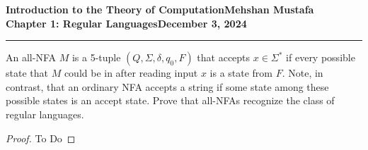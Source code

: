 \documentclass[11pt]{article}
\newcommand{\myname}{Mehshan Mustafa}
\newcommand{\dated}{December 3, 2024} %
\newenvironment{problem}[2][Problem]{\begin{trivlist}
\item[\hskip \labelsep {\bfseries #1}\hskip \labelsep {\bfseries #2.}]}{\end{trivlist}}
\begin{document}
\textbf{Introduction to the Theory of
Computation}\hfill\textbf{\myname}\\[0.01in]
\textbf{Chapter 1: Regular Languages}\hfill\textbf{\dated}\\
\smallskip\hrule\bigskip

\begin{problem}{1.38}
An all-NFA $M$ is a 5-tuple $(Q, \Sigma, \delta, q_{0}, F)$ that accepts $x \in \Sigma^{*}$ if every possible state that $M$ could be in after reading input $x$ is a state from $F$. Note, in contrast, that an ordinary NFA accepts a string if some state among these possible states is an accept state. Prove that all-NFAs recognize the class of regular languages.
\end{problem}

\begin{proof}
To Do
\end{proof}
\end{document}
